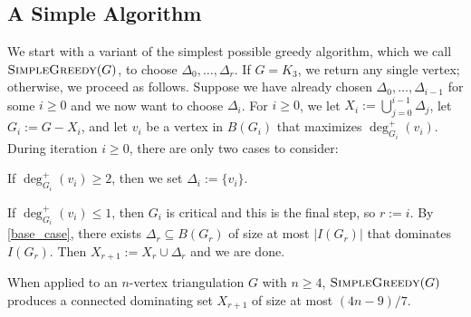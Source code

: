 \documentclass{patmorin}
\begin{document}
\subsection{A Simple Algorithm} \label{warm_up}
We start with a variant of the simplest possible greedy algorithm, which we call $\textsc{SimpleGreedy}(G)$, to choose $\Delta_0,\ldots,\Delta_{r}$. If $G=K_3$, we return any single vertex; otherwise, we proceed as follows.  Suppose we have already chosen $\Delta_0,\ldots,\Delta_{i-1}$ for some $i\ge 0$ and we now want to choose $\Delta_i$. For $i \geq 0$, we let $X_i:=\bigcup_{j=0}^{i-1}\Delta_j$, let $G_i:=G-X_i$, and let $v_i$ be a vertex in $B(G_i)$ that maximizes $\deg^+_{G_i}(v_i)$.  During iteration $i\ge 0$, there are only two cases to consider:
\begin{enumerate}[label={[g\arabic*]}]
    \item If $\deg^+_{G_i}(v_i)\ge 2$, then we set $\Delta_i := \{v_i\}$.
    \item If $\deg^+_{G_i}(v_i)\le 1$, then $G_i$ is critical and this is the final step, so $r:=i$.  By \cref{base_case}, there exists $\Delta_r\subseteq B(G_r)$ of size at most $|I(G_r)|$ that dominates $I(G_r)$. Then $X_{r+1}:=X_r\cup\Delta_r$ and we are done.
\end{enumerate}

\begin{thm}\label{simple_greedy}
  When applied to an $n$-vertex triangulation $G$ with $n\ge4$, $\textnormal{\textsc{SimpleGreedy}}(G)$ produces a connected dominating set $X_{r+1}$ of size at most $(4n-9)/7$.
\end{thm}
\end{document}
